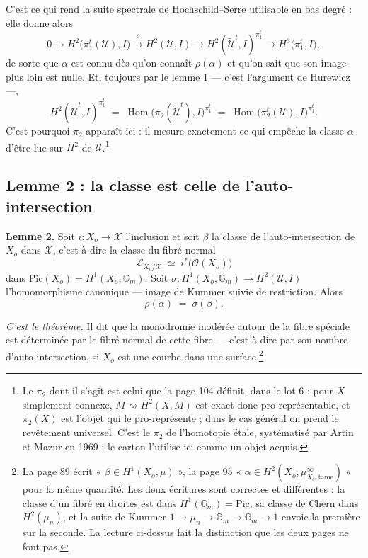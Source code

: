 \documentclass[11pt,a4paper]{article}
\begin{document}
C'est ce qui rend la suite spectrale de Hochschild--Serre utilisable en bas
degré : elle donne alors
\[
  0 \to H^{2}\bigl(\pi_{1}^{t}(\mathcal{U}), I\bigr)
  \xrightarrow{\ \rho\ } H^{2}(\mathcal{U}, I) \to
  H^{2}(\tilde{\mathcal{U}}^{t}, I)^{\pi_{1}^{t}} \to
  H^{3}\bigl(\pi_{1}^{t}, I\bigr) ,
\]
de sorte que $\alpha$ est connu dès qu'on connaît $\rho(\alpha)$ et qu'on sait
que son image plus loin est nulle. Et, toujours par le lemme 1 --- c'est
l'argument de Hurewicz ---,
\[
  H^{2}(\tilde{\mathcal{U}}^{t}, I)^{\pi_{1}^{t}} \;=\;
  \operatorname{Hom}\bigl(\pi_{2}(\tilde{\mathcal{U}}^{t}), I\bigr)^{\pi_{1}^{t}}
  \;=\; \operatorname{Hom}\bigl(\pi_{2}^{t}(\mathcal{U}), I\bigr)^{\pi_{1}^{t}} .
\]
C'est pourquoi $\pi_{2}$ apparaît ici : il mesure exactement ce qui empêche la
classe $\alpha$ d'être lue sur $H^{2}$ de $\mathcal{U}$.\footnote{Le
$\pi_{2}$ dont il s'agit est celui que la page 104 définit, dans le lot 6 :
pour $X$ simplement connexe, $M \rightsquigarrow H^{2}(X,M)$ est exact donc
pro-représentable, et $\pi_{2}(X) $ est l'objet qui le pro-représente ; dans le
cas général on prend le revêtement universel. C'est le $\pi_{2}$ de l'homotopie
étale, systématisé par Artin et Mazur en 1969 ; le carton l'utilise ici comme
un objet acquis.}

\subsection*{Lemme 2 : la classe est celle de l'auto-intersection}

\textbf{Lemme 2.} Soit $i : X_{o} \to \mathcal{X}$ l'inclusion et soit $\beta$
la classe de l'auto-intersection de $X_{o}$ dans $\mathcal{X}$, c'est-à-dire la
classe du fibré normal
\[
  \mathcal{L}_{X_{o}/\mathcal{X}} \;\simeq\; i^{*}\bigl(\mathcal{O}(X_{o})\bigr)
\]
dans $\mathrm{Pic}(X_{o}) = H^{1}(X_{o}, \mathbb{G}_{m})$. Soit
$\sigma : H^{1}(X_{o}, \mathbb{G}_{m}) \to H^{2}(\mathcal{U}, I)$
l'homomorphisme canonique --- image de Kummer suivie de restriction. Alors
\[
  \rho(\alpha) \;=\; \sigma(\beta) .
\]

\emph{C'est le théorème.} Il dit que la monodromie modérée autour de la fibre
spéciale est déterminée par le fibré normal de cette fibre --- c'est-à-dire par
son nombre d'auto-intersection, si $X_{o}$ est une courbe dans une
surface.\footnote{La page 89 écrit « $\beta \in H^{1}(X_{o}, \mu)$ », la page
95 « $\alpha \in H^{2}(X_{o}, \mu^{\infty}_{X_{o},\mathrm{tame}})$ » pour la
même quantité. Les deux écritures sont correctes et différentes : la classe
d'un fibré en droites est dans $H^{1}(\mathbb{G}_{m}) = \mathrm{Pic}$, sa
classe de Chern dans $H^{2}(\mu_{n})$, et la suite de Kummer
$1 \to \mu_{n} \to \mathbb{G}_{m} \to \mathbb{G}_{m} \to 1$ envoie la première
sur la seconde. La lecture ci-dessus fait la distinction que les deux pages ne
font pas.}
\end{document}
